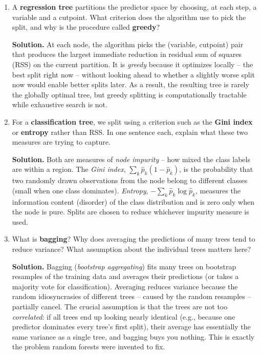 \documentclass[11pt]{article}
\newcommand{\solution}[1]{%
  \par\medskip\noindent\textbf{Solution.} #1\par\medskip
}
\begin{document}
\begin{enumerate}[leftmargin=*, resume]

\item A \textbf{regression tree} partitions the predictor space by choosing, at each step, a variable and a cutpoint. What criterion does the algorithm use to pick the split, and why is the procedure called \textbf{greedy}?

\solution{At each node, the algorithm picks the (variable, cutpoint) pair that produces the largest immediate reduction in residual sum of squares (RSS) on the current partition. It is \emph{greedy} because it optimizes locally -- the best split right now -- without looking ahead to whether a slightly worse split now would enable better splits later. As a result, the resulting tree is rarely the globally optimal tree, but greedy splitting is computationally tractable while exhaustive search is not.}

\item For a \textbf{classification tree}, we split using a criterion such as the \textbf{Gini index} or \textbf{entropy} rather than RSS. In one sentence each, explain what these two measures are trying to capture.

\solution{Both are measures of \emph{node impurity} -- how mixed the class labels are within a region. The \emph{Gini index}, $\sum_k \hat p_k (1 - \hat p_k)$, is the probability that two randomly drawn observations from the node belong to different classes (small when one class dominates). \emph{Entropy}, $-\sum_k \hat p_k \log \hat p_k$, measures the information content (disorder) of the class distribution and is zero only when the node is pure. Splits are chosen to reduce whichever impurity measure is used.}

\item What is \textbf{bagging}? Why does averaging the predictions of many trees tend to reduce variance? What assumption about the individual trees matters here?

\solution{Bagging (\emph{bootstrap aggregating}) fits many trees on bootstrap resamples of the training data and averages their predictions (or takes a majority vote for classification). Averaging reduces variance because the random idiosyncrasies of different trees -- caused by the random resamples -- partially cancel. The crucial assumption is that the trees are not too \emph{correlated}: if all trees end up looking nearly identical (e.g., because one predictor dominates every tree's first split), their average has essentially the same variance as a single tree, and bagging buys you nothing. This is exactly the problem random forests were invented to fix.}


\end{enumerate}
\end{document}
